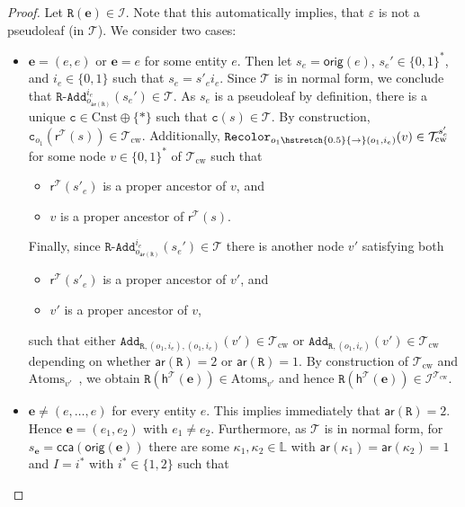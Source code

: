 \documentclass[10pt,a4paper]{amsart}
\theoremstyle{definition}
\numberwithin{equation}{section}
\theoremstyle{plain}
\theoremstyle{definition}
\theoremstyle{myexample}
\theoremstyle{plain}
\theoremstyle{definition}
\renewcommand{\vec}[1]{\boldsymbol{#1}}
\newcommand{\instance}{\mathcal{I}}
\newcommand{\inst}{\instance}
\newcommand{\origcol}{o}
\newcommand{\cols}{\mathbb{L}}
\newcommand{\arity}[1]{\fcn{ar}(#1)}
\newcommand{\disun}{\oplus}
\newcommand{\unradd}[2]{#2\pred{\texttt{-}Add}_{#1}}
\newcommand{\fcn}[1]{\mathsf{#1}}
\newcommand{\pred}[1]{\mathtt{#1}}
\newcommand{\const}[1]{\mathtt{#1}}
\newcommand{\ve}{\vec{e}}
\newcommand{\rpred}{\pred{R}}
\newcommand{\shortto}{\hstretch{0.5}{\to}}
\begin{document}
\begin{proof}
	
	Let $\rpred(\ve)\in\inst$. Note that this automatically implies, that $\varepsilon$ is not a pseudoleaf (in $\mathcal{T}$). We consider two cases:
	\begin{itemize}
		\item $\ve = (e, e)$ or $\ve = e$ for some entity $e$. Then let $s_e = \fcn{orig}(e)$, $s_e'\in\{ 0,1 \}^*$, and $i_e\in\{ 0,1 \}$ such that $s_e = s'_ei_e$. Since $\mathcal{T}$ is in normal form, we conclude that $\unradd{\origcol_{\arity{\rpred}}}{\rpred}^{i_e}(s_e')\in\mathcal{T}$. As $s_e$ is a pseudoleaf by definition, there is a unique $\const{c}\in\mathrm{Cnst}\disun \{ \ast \}$ such that $\const{c}(s)\in\mathcal{T}$. By construction, $\const{c}_{\origcol_1}(\fcn{r}^{\mathcal{T}}\!(s))\in\mathcal{T}_{\mathrm{cw}}$. Additionally, $\pred{Recolor}_{\origcol_{1} \shortto (\origcol_1, i_e)}(v)\in\mathcal{T}^{s_e'}_{\mathrm{cw}}$ for some node $v\in\{ 0,1 \}^{\ast}$ of $\mathcal{T}_{\mathrm{cw}}$ such that 
		\begin{itemize}
			\item $\fcn{r}^{\mathcal{T}}\!(s'_e)$ is a proper ancestor of $v$, and
			\item $v$ is a proper ancestor of $\fcn{r}^{\mathcal{T}}\!(s)$.
		\end{itemize}
		Finally, since $\unradd{\origcol_{\arity{\rpred}}}{\rpred}^{i_e}(s_e')\in\mathcal{T}$ there is another node $v'$ satisfying both 
		\begin{itemize}
			\item $\fcn{r}^{\mathcal{T}}\!(s'_e)$ is a proper ancestor of $v'$, and
			\item $v'$ is a proper ancestor of $v$,
		\end{itemize}
		such that either $\pred{Add}_{\rpred, (\origcol_1, i_e), (\origcol_1, i_e)}(v')\in\mathcal{T}_{\mathrm{cw}}$ or $\pred{Add}_{\rpred, (\origcol_1, i_e)}(v')\in\mathcal{T}_{\mathrm{cw}}$ depending on whether $\arity{\rpred}= 2$ or $\arity{\rpred}= 1$. By construction of $\mathcal{T}_{\mathrm{cw}}$ and $\mathrm{Atoms}_{v'}$~\cite[Definition 7]{ICDT2023}, we obtain $\rpred(\fcn{h}^{\mathcal{T}}\!(\ve))\in\mathrm{Atoms}_{v'}$ and hence $\rpred(\fcn{h}^{\mathcal{T}}\!(\ve))\in\inst^{\mathcal{T}_{\mathrm{cw}}}$.
		\item $\ve \neq (e, \ldots, e)$ for every entity $e$. This implies immediately that $\arity{\rpred} = 2$. Hence $\ve = (e_1, e_2)$ with $e_1\neq e_2$. Furthermore, as $\mathcal{T}$ is in normal form, for $s_{\ve} = \fcn{cca}(\fcn{orig}(\ve))$ there are some $\kappa_1, \kappa_2\in\cols$ with $\arity{\kappa_1} = \arity{\kappa_2} = 1$ and $I = {i^*}$ with $i^*\in\{ 1,2 \}$ such that 

\end{itemize}
\end{proof}
\end{document}
